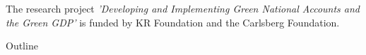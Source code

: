 

    \newcommand{\inline}[1]{}  %




\begin{frame}
    \maketitle
    \footnotesize
    The research project \textit{’Developing and Implementing Green National Accounts and the Green GDP’} is funded by KR Foundation and the Carlsberg Foundation.
\end{frame}




\begin{frame}{Outline}
    \tableofcontents
\end{frame}







